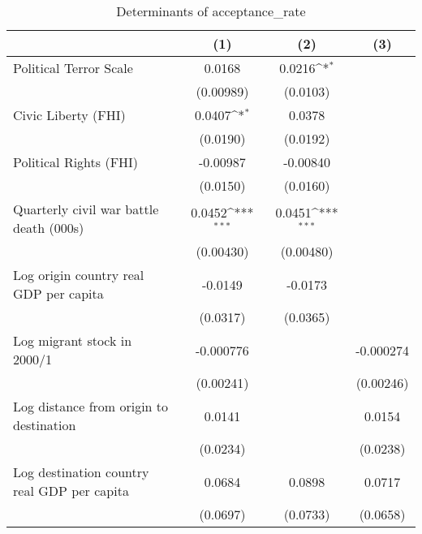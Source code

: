\begin{table}[htbp]\centering
\def\sym#1{\ifmmode^{#1}\else\(^{#1}\)\fi}
\caption{Determinants of acceptance\_rate}
\begin{tabular}{l*{3}{c}}
\hline\hline
                    &\multicolumn{1}{c}{(1)}         &\multicolumn{1}{c}{(2)}         &\multicolumn{1}{c}{(3)}         \\
\hline
Political Terror Scale&      0.0168         &      0.0216\sym{*}  &                     \\
                    &   (0.00989)         &    (0.0103)         &                     \\
[1em]
Civic Liberty (FHI) &      0.0407\sym{*}  &      0.0378         &                     \\
                    &    (0.0190)         &    (0.0192)         &                     \\
[1em]
Political Rights (FHI)&    -0.00987         &    -0.00840         &                     \\
                    &    (0.0150)         &    (0.0160)         &                     \\
[1em]
Quarterly civil war battle death (000s)&      0.0452\sym{***}&      0.0451\sym{***}&                     \\
                    &   (0.00430)         &   (0.00480)         &                     \\
[1em]
Log origin country real GDP per capita&     -0.0149         &     -0.0173         &                     \\
                    &    (0.0317)         &    (0.0365)         &                     \\
[1em]
Log migrant stock in 2000/1&   -0.000776         &                     &   -0.000274         \\
                    &   (0.00241)         &                     &   (0.00246)         \\
[1em]
Log distance from origin to destination&      0.0141         &                     &      0.0154         \\
                    &    (0.0234)         &                     &    (0.0238)         \\
[1em]
Log destination country real GDP per capita&      0.0684         &      0.0898         &      0.0717         \\
                    &    (0.0697)         &    (0.0733)         &    (0.0658)         \\

\end{tabular}
\end{table}
